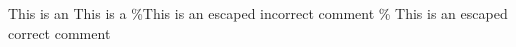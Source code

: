 This is an %
This is a %
\%This is an escaped incorrect comment
\% This is an escaped correct comment
